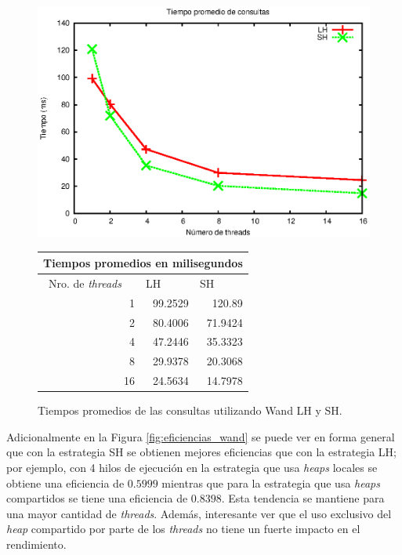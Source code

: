 \begin{figure}[tp]
  \begin{minipage}[][][b]{0.5\linewidth}
    \centering
    \includegraphics[width=\linewidth]{images/tiempos_wand_updated.eps}
  \end{minipage}%
  \begin{minipage}[b]{0.30\linewidth}
    		\centering
		\begin{tabular}{|r|r|r|}
		\hline
		\multicolumn{ 3}{|c|}{Tiempos promedios en milisegundos} \\ \hline
		\multicolumn{1}{|l|}{\ Nro. de \textit{threads}} & \multicolumn{1}{l|}{LH} & \multicolumn{1}{l|}{SH} \\ \hline
		1 & 99.2529 & 120.89 \\ \hline
		2 & 80.4006 & 71.9424 \\ \hline
		4 & 47.2446 & 35.3323 \\ \hline
		8 & 29.9378 & 20.3068 \\ \hline
		16 & 24.5634 & 14.7978 \\ \hline
		\end{tabular}
   \end{minipage}
\caption{Tiempos promedios de las consultas utilizando Wand LH y SH.}
\label{fig:tiempos_wand}
\end{figure}


Adicionalmente en la Figura \ref{fig:eficiencias_wand} se puede ver en forma general que con la estrategia SH se obtienen mejores eficiencias que con la estrategia LH; por ejemplo, con 4 hilos de ejecución en la estrategia que usa \textit{heaps} locales se obtiene una eficiencia de $0.5999$ mientras que para la estrategia que usa \textit{heaps} compartidos se tiene una eficiencia de $0.8398$. Esta tendencia se mantiene para una mayor cantidad de \textit{threads}. Además, interesante ver que el uso exclusivo del \textit{heap} compartido por parte de los \textit{threads} no tiene un fuerte impacto en el rendimiento. 

